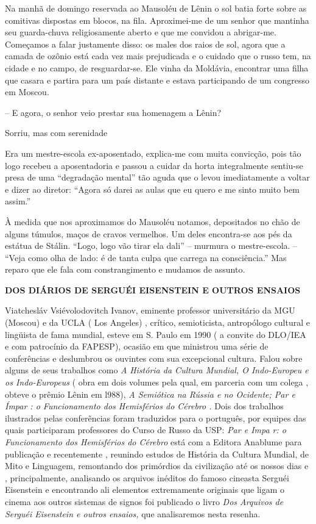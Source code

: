 Na manhã de domingo reservada ao Mausoléu de Lênin o sol batia forte
sobre as comitivas dispostas em blocos, na fila. Aproximei-me de um
senhor que mantinha seu guarda-chuva religiosamente aberto e que me
convidou a abrigar-me. Começamos a falar justamente disso: os males dos
raios de sol, agora que a camada de ozônio está cada vez mais
prejudicada e o cuidado que o russo tem, na cidade e no campo, de
resguardar-se. Ele vinha da Moldávia, encontrar uma filha que casara e
partira para um país distante e estava participando de um congresso em
Moscou.

-- E agora, o senhor veio prestar sua homenagem a Lênin?

Sorriu, mas com serenidade

Era um mestre-escola ex-aposentado, explica-me com muita convicção, pois
tão logo recebeu a aposentadoria e passou a cuidar da horta
integralmente sentiu-se presa de uma ``degradação mental'' tão aguda que
o levou imediatamente a voltar e dizer ao diretor: ``Agora só darei as
aulas que eu quero e me sinto muito bem assim.''

À medida que nos aproximamos do Mausoléu notamos, depositados no chão de
alguns túmulos, maços de cravos vermelhos. Um deles encontra-se aos pés
da estátua de Stálin. ``Logo, logo vão tirar ela dali'' -- murmura o
mestre-escola. -- ``Veja como olha de lado: é de tanta culpa que carrega
na consciência.'' Mas reparo que ele fala com constrangimento e mudamos
de assunto.

\textbf{DOS DIÁRIOS DE SERGUÉI EISENSTEIN E OUTROS ENSAIOS}

Viatchesláv Vsiévolodovitch Ivanov, eminente professor universitário da
MGU (Moscou) e da UCLA ( Los Angeles) , crítico, semioticista,
antropólogo cultural e lingüista de fama mundial, esteve em S. Paulo em
1990 ( a convite do DLO/IEA e com patrocínio da FAPESP), ocasião em que
ministrou uma série de conferências e deslumbrou os ouvintes com sua
excepcional cultura. Falou sobre alguns de seus trabalhos como \emph{A}
\emph{História da Cultura Mundial, O Indo-Europeu e os Indo-Europeus} (
obra em dois volumes pela qual, em parceria com um colega , obteve o
prêmio Lênin em l988), \emph{A Semiótica na Rússia e no Ocidente; Par e
Ímpar : o Funcionamento dos Hemisférios do Cérebro .} Dois dos trabalhos
ilustrados pelas conferências foram traduzidos para o português, por
equipes das quais participaram professores do Curso de Russo da USP:
\emph{Par e Impa r: o Funcionamento dos Hemisférios do Cérebro} está com
a Editora Anablume para publicação e recentemente , reunindo estudos de
História da Cultura Mundial, de Mito e Linguagem, remontando dos
primórdios da civilização até os nossos dias e , principalmente,
analisando os arquivos inéditos do famoso cineasta Serguéi Eisenstein e
encontrando ali elementos extremamente originais que ligam o cinema aos
outros sistemas de signos foi publicado o livro \emph{Dos Arquivos de
Serguéi Eisenstein e outros ensaios,} que analisaremos nesta resenha.

